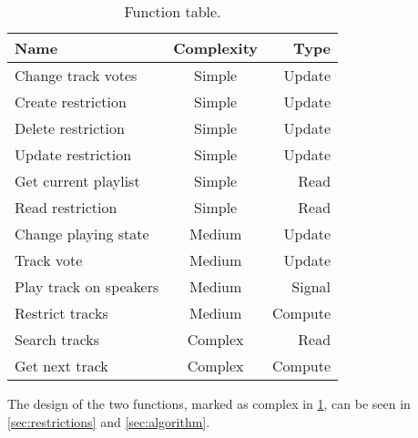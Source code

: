 \begin{table}[hbtp]
\centering
\begin{tabular}{lcr}
\toprule
\textbf{Name}									 & \textbf{Complexity}	& \textbf{Type} \\
\midrule
Change track votes             & Simple								& Update  \\
Create restriction             & Simple								& Update  \\
Delete restriction             & Simple								& Update  \\
Update restriction             & Simple								& Update  \\
Get current playlist           & Simple								& Read    \\
Read restriction               & Simple								& Read    \\
Change playing state           & Medium								& Update  \\
Track vote                     & Medium								& Update  \\
Play track on speakers         & Medium								& Signal  \\
Restrict tracks                & Medium								& Compute \\
Search tracks                  & Complex							& Read    \\
Get next track                 & Complex							& Compute \\
\bottomrule
\end{tabular}
\caption{Function table.}
\label{table:functionlist}
\end{table}

The design of the two functions, marked as complex in \cref{table:functionlist}, can be seen in \cref{sec:restrictions} and \cref{sec:algorithm}.